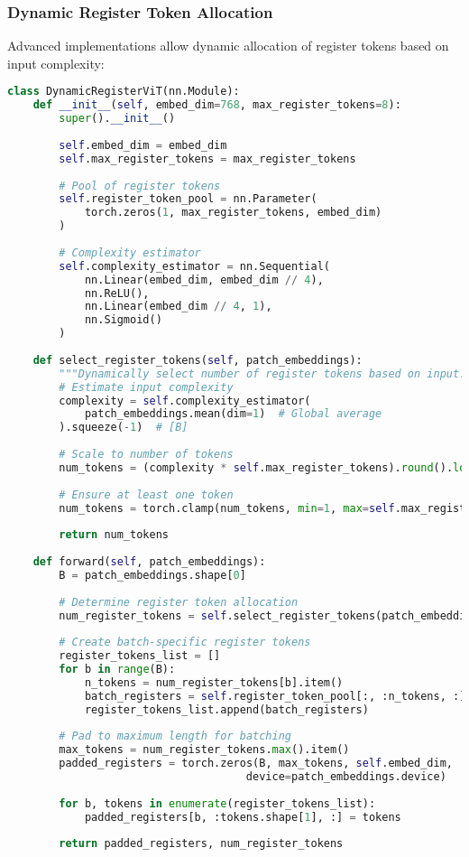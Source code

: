\subsubsection{Dynamic Register Token Allocation}

Advanced implementations allow dynamic allocation of register tokens based on input complexity:

\begin{lstlisting}[language=Python, caption=Dynamic register token allocation]
class DynamicRegisterViT(nn.Module):
    def __init__(self, embed_dim=768, max_register_tokens=8):
        super().__init__()
        
        self.embed_dim = embed_dim
        self.max_register_tokens = max_register_tokens
        
        # Pool of register tokens
        self.register_token_pool = nn.Parameter(
            torch.zeros(1, max_register_tokens, embed_dim)
        )
        
        # Complexity estimator
        self.complexity_estimator = nn.Sequential(
            nn.Linear(embed_dim, embed_dim // 4),
            nn.ReLU(),
            nn.Linear(embed_dim // 4, 1),
            nn.Sigmoid()
        )
    
    def select_register_tokens(self, patch_embeddings):
        """Dynamically select number of register tokens based on input."""
        # Estimate input complexity
        complexity = self.complexity_estimator(
            patch_embeddings.mean(dim=1)  # Global average
        ).squeeze(-1)  # [B]
        
        # Scale to number of tokens
        num_tokens = (complexity * self.max_register_tokens).round().long()
        
        # Ensure at least one token
        num_tokens = torch.clamp(num_tokens, min=1, max=self.max_register_tokens)
        
        return num_tokens
    
    def forward(self, patch_embeddings):
        B = patch_embeddings.shape[0]
        
        # Determine register token allocation
        num_register_tokens = self.select_register_tokens(patch_embeddings)
        
        # Create batch-specific register tokens
        register_tokens_list = []
        for b in range(B):
            n_tokens = num_register_tokens[b].item()
            batch_registers = self.register_token_pool[:, :n_tokens, :].expand(1, -1, -1)
            register_tokens_list.append(batch_registers)
        
        # Pad to maximum length for batching
        max_tokens = num_register_tokens.max().item()
        padded_registers = torch.zeros(B, max_tokens, self.embed_dim, 
                                     device=patch_embeddings.device)
        
        for b, tokens in enumerate(register_tokens_list):
            padded_registers[b, :tokens.shape[1], :] = tokens
        
        return padded_registers, num_register_tokens
\end{lstlisting}

